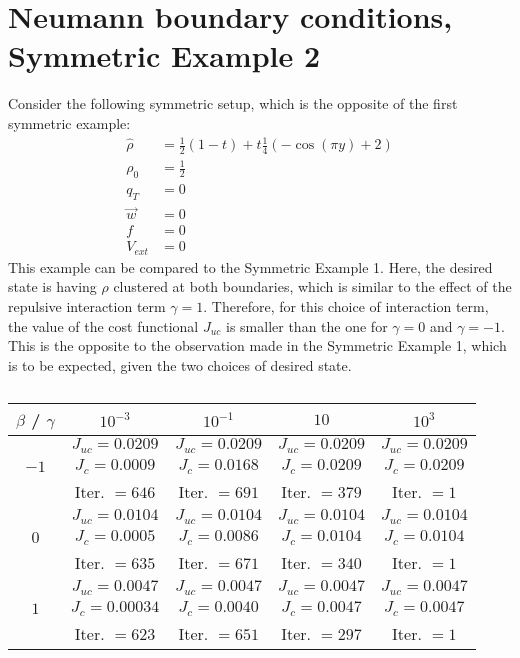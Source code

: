 \documentclass[11pt, a4paper]{article}
\theoremstyle{definition}
\begin{document}
	
	\section{Neumann boundary conditions, Symmetric Example 2}
	Consider the following symmetric setup, which is the opposite of the first symmetric example:
	\begin{align*}
	\widehat \rho &= \frac{1}{2}(1-t) + t\frac{1}{4}(-\cos(\pi y)+2)\\
	\rho_{0} &= \frac{1}{2}\\
	q_{T} &= 0\\
	\vec{w} &= 0\\
	f &=0\\
	V_{ext} &=0
	\end{align*}
	This example can be compared to the Symmetric Example 1. Here, the desired state is having $\rho$ clustered at both boundaries, which is similar to the effect of the repulsive interaction term $\gamma = 1$. Therefore, for this choice of interaction term, the value of the cost functional $J_{uc}$ is smaller than the one for $\gamma = 0$ and $\gamma = -1$. This is the opposite to the observation made in the Symmetric Example 1, which is to be expected, given the two choices of desired state.
	
	\begin{table}
		\begin{tabular}{ ||c|| c | c |c | c ||}
			\hline
			$\beta$ / $\gamma$ & $10^{-3}$  & $10^{-1}$  & $10$ & $10^3$ \\ 
			\hline 
			& $J_{uc} = 0.0209$ & $J_{uc} = 0.0209$  & $J_{uc} = 0.0209$ & $J_{uc} = 0.0209$\\ 
			$-1$ & $J_c = 0.0009$ & $J_c = 0.0168$ & $J_c = 0.0209$ & $J_c = 0.0209$\\ 
			& Iter. $= 646$ & Iter. $= 691$  & Iter. $= 379$ & Iter. $= 1$\\ 
			\hline
			& $J_{uc} = 0.0104$ & $J_{uc} = 0.0104$  & $J_{uc} = 0.0104$& $J_{uc} = 0.0104$\\
			$0$  & $J_c = 0.0005$ & $J_c = 0.0086$  & $J_c = 0.0104$ & $J_c = 0.0104$\\ 
			& Iter. $= 635$ & Iter. $= 671$  & Iter. $= 340$ & Iter. $= 1$\\ 
			\hline
			& $J_{uc} = 0.0047$ & $J_{uc} = 0.0047$  & $J_{uc} = 0.0047$ & $J_{uc} = 0.0047$\\
			$1$  & $J_c = 0.00034$ & $J_c = 0.0040$  & $J_c = 0.0047$ & $J_c = 0.0047$\\ 
			& Iter. $= 623$ & Iter. $= 651$  & Iter. $= 297$ & Iter. $= 1$\\ 
			\hline 
		\end{tabular}
		\caption{}
		\label{TabNFlowAddEx2}
	\end{table}
	
	
	
\end{document}
